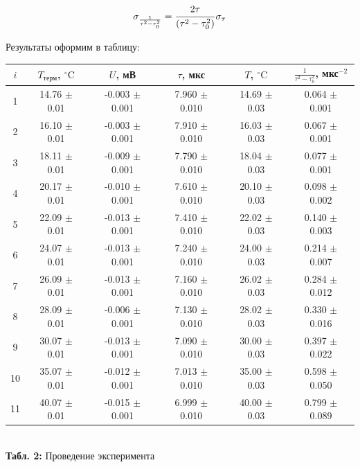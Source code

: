 \documentclass[12pt,a4paper]{scrartcl}
\begin{document}
	$$\sigma_{\frac{1}{\tau^2 - \tau_0^2}} = \dfrac{\strut 2\tau}{\strut (\tau^2 - \tau_0^2)} \sigma_{\tau}$$
	
	Результаты оформим в таблицу:
	
	\begin{center}
		\begin{tabular}{|c|c|c|c|c|c|}
			\hline
			$i$ & $T_{\text{терм}}$, $^\circ\mathrm{C}$ & $U$, мВ & $\tau$, мкс & $T$, $^\circ\mathrm{C}$ & $\frac{1}{\tau^2 - \tau_0^2}$, мкс$^{-2}$
			\\\hline
			1 & 14.76 $\pm$ 0.01 & -0.003 $\pm$ 0.001 & 7.960 $\pm$ 0.010 & 14.69 $\pm$ 0.03 & 0.064 $\pm$ 0.001
			\\\hline
			2 & 16.10 $\pm$ 0.01 & -0.003 $\pm$ 0.001 & 7.910 $\pm$ 0.010 & 16.03 $\pm$ 0.03 & 0.067 $\pm$ 0.001
			\\\hline
			3 & 18.11 $\pm$ 0.01 & -0.009 $\pm$ 0.001 & 7.790 $\pm$ 0.010 & 18.04 $\pm$ 0.03 & 0.077 $\pm$ 0.001
			\\\hline
			4 & 20.17 $\pm$ 0.01 & -0.010 $\pm$ 0.001 & 7.610 $\pm$ 0.010 & 20.10 $\pm$ 0.03 & 0.098 $\pm$ 0.002
			\\\hline
			5 & 22.09 $\pm$ 0.01 & -0.013 $\pm$ 0.001 & 7.410 $\pm$ 0.010 & 22.02 $\pm$ 0.03 & 0.140 $\pm$ 0.003
			\\\hline
			6 & 24.07 $\pm$ 0.01 & -0.013 $\pm$ 0.001 & 7.240 $\pm$ 0.010 & 24.00 $\pm$ 0.03 & 0.214 $\pm$ 0.007
			\\\hline
			7 & 26.09 $\pm$ 0.01 & -0.013 $\pm$ 0.001 & 7.160 $\pm$ 0.010 & 26.02 $\pm$ 0.03 & 0.284 $\pm$ 0.012
			\\\hline
			8 & 28.09 $\pm$ 0.01 & -0.006 $\pm$ 0.001 & 7.130 $\pm$ 0.010 & 28.02 $\pm$ 0.03 & 0.330 $\pm$ 0.016
			\\\hline
			9 & 30.07 $\pm$ 0.01 & -0.013 $\pm$ 0.001 & 7.090 $\pm$ 0.010 & 30.00 $\pm$ 0.03 & 0.397 $\pm$ 0.022
			\\\hline
			10 & 35.07 $\pm$ 0.01 & -0.012 $\pm$ 0.001 & 7.013  $\pm$ 0.010 & 35.00 $\pm$ 0.03 & 0.598 $\pm$ 0.050
			\\\hline
			11 & 40.07 $\pm$ 0.01 & -0.015 $\pm$ 0.001 & 6.999  $\pm$ 0.010 & 40.00 $\pm$ 0.03 & 0.799 $\pm$ 0.089
			\\\hline
		\end{tabular}
		\\\textbf{Табл. 2:} Проведение эксперимента
	\end{center}
	
	\newpage
	
	
\end{document}
